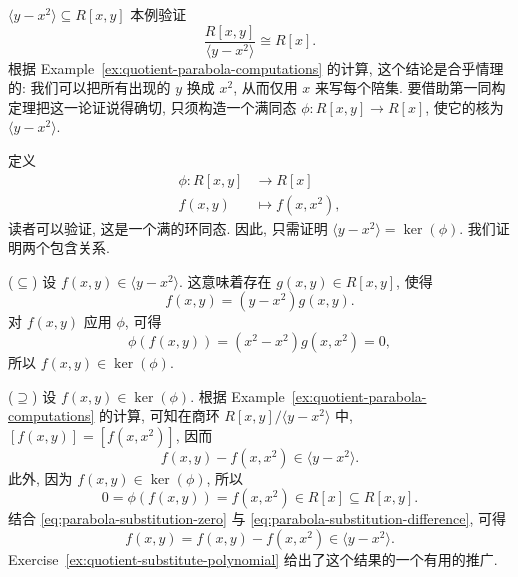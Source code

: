 \begin{Example}{{\textmd{$\langle y-x^{2}\rangle\subseteq R[x,y]$}}}\label{ex:quotient-parabola-isomorphism}
  本例验证
  \[
    \frac{R[x,y]}{\langle y-x^{2}\rangle}\cong R[x].
  \]
  根据 Example~\ref{ex:quotient-parabola-computations} 的计算, 这个结论是合乎情理的: 我们可以把所有出现的 $y$ 换成 $x^{2}$, 从而仅用 $x$ 来写每个陪集. 要借助第一同构定理把这一论证说得确切, 只须构造一个满同态 $\phi:R[x,y]\to R[x]$, 使它的核为 $\langle y-x^{2}\rangle$.

  定义
  \[
    \begin{aligned}
      \phi:R[x,y]&\to R[x]\\
      f(x,y)&\mapsto f(x,x^{2}),
    \end{aligned}
  \]
  读者可以验证, 这是一个满的环同态. 因此, 只需证明 $\langle y-x^{2}\rangle=\ker(\phi)$. 我们证明两个包含关系.

  ($\subseteq$) 设 $f(x,y)\in\langle y-x^{2}\rangle$. 这意味着存在 $g(x,y)\in R[x,y]$, 使得
  \[
    f(x,y)=(y-x^{2})g(x,y).
  \]
  对 $f(x,y)$ 应用 $\phi$, 可得
  \[
    \phi(f(x,y))=(x^{2}-x^{2})g(x,x^{2})=0,
  \]
  所以 $f(x,y)\in\ker(\phi)$.

  ($\supseteq$) 设 $f(x,y)\in\ker(\phi)$. 根据 Example~\ref{ex:quotient-parabola-computations} 的计算, 可知在商环 $R[x,y]/\langle y-x^{2}\rangle$ 中, $[f(x,y)]=[f(x,x^{2})]$, 因而
  \begin{equation}\label{eq:parabola-substitution-difference}
    f(x,y)-f(x,x^{2})\in\langle y-x^{2}\rangle.
  \end{equation}
  此外, 因为 $f(x,y)\in\ker(\phi)$, 所以
  \begin{equation}\label{eq:parabola-substitution-zero}
    0=\phi(f(x,y))=f(x,x^{2})\in R[x]\subseteq R[x,y].
  \end{equation}
  结合 \eqref{eq:parabola-substitution-zero} 与 \eqref{eq:parabola-substitution-difference}, 可得
  \[
    f(x,y)=f(x,y)-f(x,x^{2})\in\langle y-x^{2}\rangle.
  \]
  Exercise~\ref{ex:quotient-substitute-polynomial} 给出了这个结果的一个有用的推广.
\end{Example}

